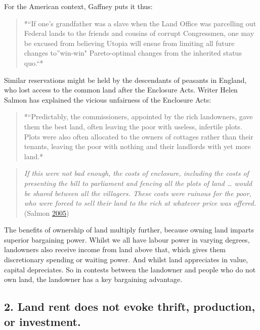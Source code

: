 \documentclass[]{tufte-handout}
\begin{document}
For the American context, Gaffney puts it thus:

\begin{quote}
*``If one's grandfather was a slave when the Land Office was parcelling
out Federal lands to the friends and cousins of corrupt Congressmen, one
may be excused from believing Utopia will ensue from limiting all future
changes to''win-win" Pareto-optimal changes from the inherited status
quo.``*
\end{quote}

Similar reservations might be held by the descendants of peasants in
England, who lost access to the common land after the Enclosure Acts.
Writer Helen Salmon has explained the vicious unfairness of the
Enclosure Acts:

\begin{quote}
*``Predictably, the commissioners, appointed by the rich landowners,
gave them the best land, often leaving the poor with useless, infertile
plots. Plots were also often allocated to the owners of cottages rather
than their tenants, leaving the poor with nothing and their landlords
with yet more land.*
\end{quote}

\begin{quote}
\emph{If this were not bad enough, the costs of enclosure, including the
costs of presenting the bill to parliament and fencing all the plots of
land \ldots{} would be shared between all the villagers. These costs
were ruinous for the poor, who were forced to sell their land to the
rich at whatever price was offered.} (Salmon
\protect\hyperlink{ref-Salmon2005}{2005})
\end{quote}

The benefits of ownership of land multiply further, because owning land
imparts superior bargaining power. Whilst we all have labour power in
varying degrees, landowners also receive income from land above that,
which gives them discretionary spending or waiting power. And whilst
land appreciates in value, capital depreciates. So in contests between
the landowner and people who do not own land, the landowner has a key
bargaining advantage.

\hypertarget{land-rent-does-not-evoke-thrift-production-or-investment.}{%
\subsection{2. Land rent does not evoke thrift, production, or
investment.}\label{land-rent-does-not-evoke-thrift-production-or-investment.}}
\end{document}
